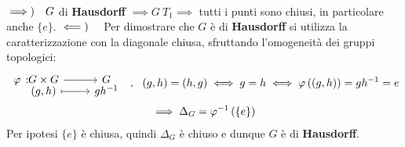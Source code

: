 \begin{demonstration}~{}\\
	$\implies)\quad G$ di \textbf{Hausdorff} $\implies G \ T_1 \implies$ tutti i punti sono chiusi, in particolare anche $\{e\}$. \newline
	$\impliedby)\quad$ Per dimostrare che $G$ è di \textbf{Hausdorff} si utilizza la caratterizzazione con la diagonale chiusa, sfruttando l'omogeneità dei gruppi topologici:
		\begin{gather*}
			\funztot \phi {G\times G} G {(g,h)} {gh^{-1}} \ \ , \ \ (g,h)=(h,g) \iff g=h\iff \phi\left( (g,h)\right)=gh^{-1}=e \\
			\implies \Delta_G =\phi^{-1}\left(\{e\}\right)
		\end{gather*}
	Per ipotesi $\{e\}$ è chiusa, quindi $\Delta_G$ è chiuso e dunque $G$ è di \textbf{Hausdorff}.
\end{demonstration}

